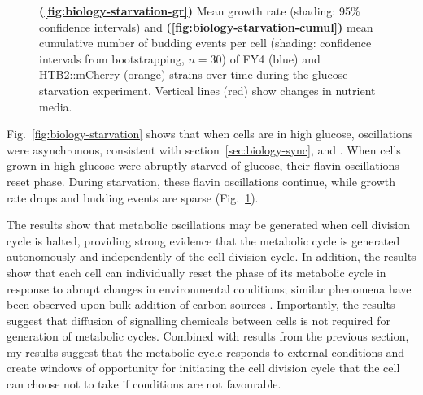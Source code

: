 \begin{figure}
  \caption{
    \textbf{(\ref{fig:biology-starvation-gr})}
    Mean growth rate (shading: 95\% confidence intervals) and
    \textbf{(\ref{fig:biology-starvation-cumul})}
    mean cumulative number of budding events per cell (shading: confidence intervals from bootstrapping, $n=30$)
    of FY4 (blue) and HTB2::mCherry (orange) strains over time during the glucose-starvation experiment.
    Vertical lines (red) show changes in nutrient media.
  }
  \label{fig:biology-starvation-gr-budprob}
\end{figure}

Fig.\ \ref{fig:biology-starvation} shows that when cells are in high glucose, oscillations were asynchronous, consistent with section~\ref{sec:biology-sync}, \textcite{papagiannakisAutonomousMetabolicOscillations2017} and \textcite{baumgartnerFlavinbasedMetabolicCycles2018}.
When cells grown in high glucose were abruptly starved of glucose, their flavin oscillations reset phase.
During starvation, these flavin oscillations continue, while growth rate drops and budding events are sparse (Fig.\ \ref{fig:biology-starvation-gr-budprob}).

The results show that metabolic oscillations may be generated when cell division cycle is halted, providing strong evidence that the metabolic cycle is generated autonomously and independently of the cell division cycle.
In addition, the results show that each cell can individually reset the phase of its metabolic cycle in response to abrupt changes in environmental conditions; similar phenomena have been observed upon bulk addition of carbon sources \parencite{kuangMsn2RegulateExpression2017, krishnaMinimalPushPull2018}.
Importantly, the results suggest that diffusion of signalling chemicals between cells is not required for generation of metabolic cycles.
Combined with results from the previous section, my results suggest that the metabolic cycle responds to external conditions and create windows of opportunity for initiating the cell division cycle that the cell can choose not to take if conditions are not favourable.


